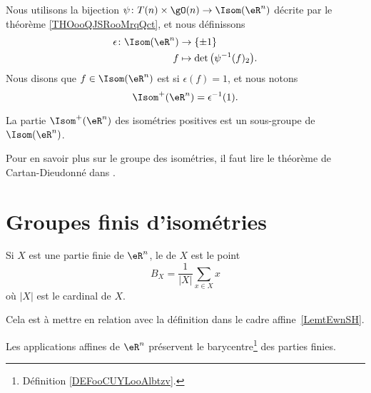 \begin{definition}      \label{DEFooOKGSooUhDIfu}
    Nous utilisons la bijection \( \psi\colon T(n)\times \gO(n)\to \Isom(\eR^n)\) décrite par le théorème \ref{THOooQJSRooMrqQct}, et nous définissons
    \begin{equation}
        \begin{aligned}
            \epsilon\colon \Isom(\eR^n)&\to \{ \pm 1 \} \\
            f&\mapsto \det\big( \psi^{-1}(f)_2 \big). 
        \end{aligned}
    \end{equation}
    Nous disons que \( f\in\Isom(\eR^n)\) est  si \( \epsilon(f)=1\), et nous notons
    \begin{equation}
        \Isom^+(\eR^n)=\epsilon^{-1}(1).
    \end{equation}
\end{definition}

\begin{lemma}       \label{LEMooVRELooESIWQl}
    La partie \( \Isom^+(\eR^n)\) des isométries positives est un sous-groupe de \( \Isom(\eR^n)\).
\end{lemma}

Pour en savoir plus sur le groupe des isométries, il faut lire le théorème de Cartan-Dieudonné dans \cite{JGAdTA}.

\section{Groupes finis d'isométries}

\begin{definition}      \label{DEFooCUYLooAlbtzv}
	Si \( X\) est une partie finie de \( \eR^n\), le  de \( X\) est le point
	\begin{equation}
		B_X=\frac{1}{ | X | }\sum_{x\in X}x
	\end{equation}
	où \( | X |\) est le cardinal de \( X\).
\end{definition}
Cela est à mettre en relation avec la définition dans le cadre affine~\ref{LemtEwnSH}.

\begin{lemma}        \label{LEMooSEZYooYceLIb}
	Les applications affines de \( \eR^n\) préservent le barycentre\footnote{Définition \ref{DEFooCUYLooAlbtzv}.} des parties finies.
\end{lemma}

